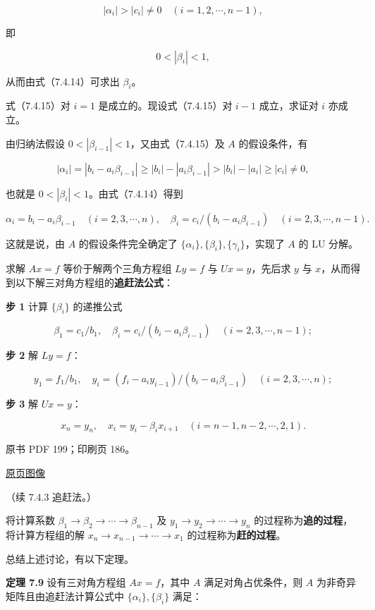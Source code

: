 \documentclass[
  10pt,
  fontset=fandol]{ctexart}
\begin{document}
\[
|\alpha_i|>|c_i|\neq0\quad(i=1,2,\cdots,n-1),
\tag{7.4.15}
\]

即

\[
0<|\beta_i|<1,
\]

从而由式（7.4.14）可求出 \(\beta_i\)。

式（7.4.15）对 \(i=1\) 是成立的。现设式（7.4.15）对 \(i-1\) 成立，求证对
\(i\) 亦成立。

由归纳法假设 \(0<|\beta_{i-1}|<1\)，又由式（7.4.15）及 \(A\)
的假设条件，有

\[
|\alpha_i|=|b_i-a_i\beta_{i-1}|\geqslant|b_i|-|a_i\beta_{i-1}|>|b_i|-|a_i|\geqslant|c_i|\neq0,
\]

也就是 \(0<|\beta_i|<1\)。由式（7.4.14）得到

\[
\alpha_i=b_i-a_i\beta_{i-1}\quad(i=2,3,\cdots,n),\quad
\beta_i=c_i/(b_i-a_i\beta_{i-1})\quad(i=2,3,\cdots,n-1).
\]

这就是说，由 \(A\) 的假设条件完全确定了
\(\{\alpha_i\},\{\beta_i\},\{\gamma_i\}\)，实现了 \(A\) 的 LU 分解。

求解 \(Ax=f\) 等价于解两个三角方程组 \(Ly=f\) 与 \(Ux=y\)，先后求 \(y\)
与 \(x\)，从而得到以下解三对角方程组的\textbf{追赶法公式}：

\textbf{步 1} 计算 \(\{\beta_i\}\) 的递推公式

\[
\beta_1=c_1/b_1,\quad\beta_i=c_i/(b_i-a_i\beta_{i-1})\quad(i=2,3,\cdots,n-1);
\]

\textbf{步 2} 解 \(Ly=f\)：

\[
y_1=f_1/b_1,\quad y_i=(f_i-a_iy_{i-1})/(b_i-a_i\beta_{i-1})\quad(i=2,3,\cdots,n);
\]

\textbf{步 3} 解 \(Ux=y\)：

\[
x_n=y_n,\quad x_i=y_i-\beta_ix_{i+1}\quad(i=n-1,n-2,\cdots,2,1).
\]

\clearpage

原书 PDF 199；印刷页 186。

\href{/Users/xiangjunfeng/Desktop/数值计算专用/numerical-analysis/book/source-images/pdf-199.jpeg}{原页图像}

（续 7.4.3 追赶法。）

将计算系数 \(\beta_1\to\beta_2\to\cdots\to\beta_{n-1}\) 及
\(y_1\to y_2\to\cdots\to y_n\)
的过程称为\textbf{追的过程}，将计算方程组的解
\(x_n\to x_{n-1}\to\cdots\to x_1\) 的过程称为\textbf{赶的过程}。

总结上述讨论，有以下定理。

\textbf{定理 7.9} 设有三对角方程组 \(Ax=f\)，其中 \(A\)
满足对角占优条件，则 \(A\) 为非奇异矩阵且由追赶法计算公式中
\(\{\alpha_i\},\{\beta_i\}\) 满足：
\end{document}
